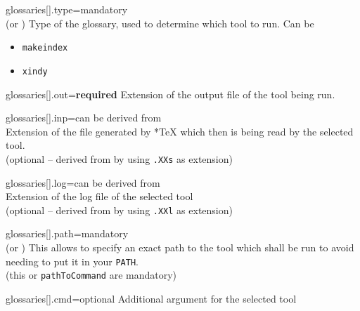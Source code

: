 \documentclass[a4paper, 11pt]{scrartcl}
\let\TeXold\TeX
\renewcommand\TeX{\TeXold\xspace}
\begin{document}
\begin{docKey}[config][
	]{glossaries[].type}{=}{mandatory\\(or )}
	Type of the glossary, used to determine which tool to run.
	Can be
	\begin{multicols}{2}
		\begin{itemize}
			\item \texttt{makeindex}
			\item \texttt{xindy}
		\end{itemize}
	\end{multicols}
\end{docKey}
\begin{docKey}[config][
	]{glossaries[].out}{=}{\textcolor{CtpRed}{\bfseries\sffamily required}}
	Extension of the output file of the tool being run.
\end{docKey}
\begin{docKey}[config][
	]{glossaries[].inp}{=}{can be derived from \\}
	Extension of the file generated by *\TeX which then is being read by the selected tool.
	\\
	(optional -- derived from  by using \texttt{.XXs} as extension)
\end{docKey}
\begin{docKey}[config][
	]{glossaries[].log}{=}{can be derived from \\}
	Extension of the log file of the selected tool
	\\
	(optional -- derived from  by using \texttt{.XXl} as extension)
\end{docKey}
\begin{docKey}[config][
	]{glossaries[].path}{=}{mandatory\\(or )}
	This allows to specify an exact path to the tool which shall be run to avoid needing to put it in your \texttt{PATH}.
	\\
	(this or \texttt{pathToCommand} are mandatory)
\end{docKey}
\begin{docKey}[config][
	]{glossaries[].cmd}{=}{optional}
	Additional argument for the selected tool
\end{docKey}
\end{document}
